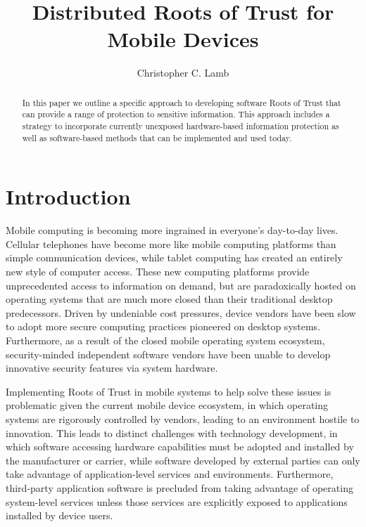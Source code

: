 \documentclass[10pt,letterpaper]{article}
\author{Christopher C. Lamb}
\title{Distributed Roots of Trust for Mobile Devices}
\begin{document}
\maketitle
\begin{abstract}
In this paper we outline a specific approach to developing software Roots of Trust that can provide a range of protection to sensitive information. This approach includes a strategy to incorporate currently unexposed hardware-based information protection as well as software-based methods that can be implemented and used today.
\end{abstract}

\section{Introduction}
Mobile computing is becoming more ingrained in everyone's day-to-day lives. Cellular telephones have become more like mobile computing platforms than simple communication devices, while tablet computing has created an entirely new style of computer access. These new computing platforms provide unprecedented access to information on demand, but are paradoxically hosted on operating systems that are much more closed than their traditional desktop predecessors. Driven by undeniable cost pressures, device vendors have been slow to adopt more secure computing practices pioneered on desktop systems. Furthermore, as a result of the closed mobile operating system ecosystem, security-minded independent software vendors have been unable to develop innovative security features via system hardware.

Implementing Roots of Trust in mobile systems to help solve these issues is problematic given the current mobile device ecosystem, in which operating systems are rigorously controlled by vendors, leading to an environment hostile to innovation. This leads to distinct challenges with technology development, in which software accessing hardware capabilities must be adopted and installed by the manufacturer or carrier, while software developed by external parties can only take advantage of application-level services and environments. Furthermore, third-party application software is precluded from taking advantage of operating system-level services unless those services are explicitly exposed to applications installed by device users.
\end{document}
